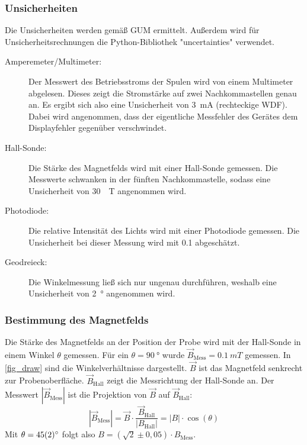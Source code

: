 \documentclass[
	a4paper,
	12pt,
	pagesize,
	ngerman
]{scrartcl}
\begin{document}
	\subsubsection{Unsicherheiten} %
	Die Unsicherheiten werden gemäß GUM ermittelt. 
	Außerdem wird für Unsicherheitsrechnungen die Python-Bibliothek "uncertainties" verwendet.
	\begin{description}
		\item[Amperemeter/Multimeter:] Der Messwert des Betriebsstroms der Spulen wird von einem Multimeter abgelesen. 
			Dieses zeigt die Stromstärke auf zwei Nachkommastellen genau an. 
			Es ergibt sich also eine Unsicherheit von \SI{3}{mA} (rechteckige WDF).
			Dabei wird angenommen, dass der eigentliche Messfehler des Gerätes dem Displayfehler gegenüber verschwindet. 
		\item[Hall-Sonde:]  Die Stärke des Magnetfelds wird mit einer Hall-Sonde gemessen. Die Messwerte schwanken in der fünften Nachkommastelle, sodass eine Unsicherheit von \SI{30}{\mu T} angenommen wird.
		\item[Photodiode:]  Die relative Intensität des Lichts wird mit einer Photodiode gemessen. Die Unsicherheit bei dieser Messung wird mit \SI{0,1}{} abgeschätzt.
		\item[Geodreieck:]  Die Winkelmessung ließ sich nur ungenau durchführen, weshalb eine Unsicherheit von \SI{2}{\degree} angenommen wird.
	\end{description} 

	\subsubsection{Bestimmung des Magnetfelds}
	\label{ss_spule}
	Die Stärke des Magnetfelds an der Position der Probe wird mit der Hall-Sonde in einem Winkel $\theta$ gemessen.
	Für ein $\theta=\SI{90}{\degree}$ wurde $\vec B_\text{Mess} = \SI{0,1}{mT}$ gemessen.
	In \cref{fig_draw} sind die Winkelverhältnisse dargestellt. 
	$\vec B$ ist das Magnetfeld senkrecht zur Probenoberfläche. 
	$\vec B_\text{Hall}$ zeigt die Messrichtung der Hall-Sonde an.
	Der Messwert $ \left| \vec B_\text{Mess}\right| $ ist die Projektion von $\vec B$ auf $\vec B_\text{Hall}$:
	\begin{equation}
		\left| \vec B_\text{Mess}\right|  = \vec B \cdot \frac{\vec B_\text{Hall}}{\left| B_\text{Hall} \right|} = \left| B \right| \cdot \cos(\theta)
	\end{equation}
	Mit $\theta=\SI{45\pm 2}{\degree}$ folgt also $B = (\sqrt{2}\pm0,05) \cdot B_\text{Mess}$.
\end{document}
